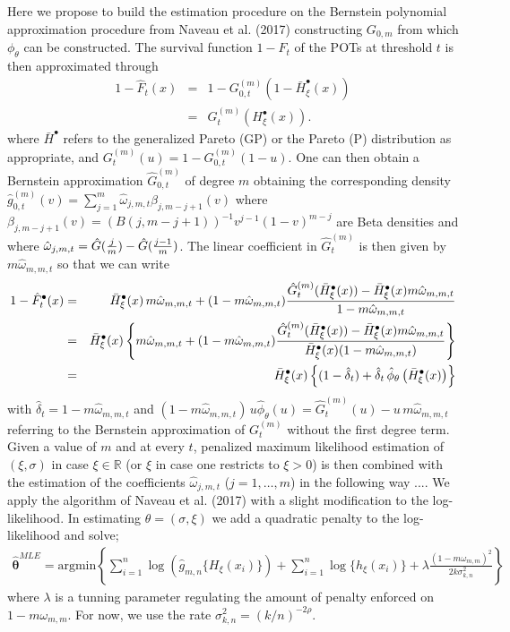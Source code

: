\documentclass[a4paper,11pt]{article}
\begin{document}
 Here we propose to build the estimation procedure on the Bernstein polynomial approximation procedure from Naveau et al. (2017) constructing $G_{0,m}$ from which $\phi_{\theta}$ can be constructed. The survival function $1-F_t$ of the POTs at threshold $t$ is then approximated through
 \begin{eqnarray*}
 1-\hat{F}_t(x) &=& 1- G_{0,t}^{(m)}\left(1-\bar{H}^{\bullet}_{\xi}(x)\right) \\
 &=& G_{t}^{(m)}\left( H^{\bullet}_{\xi}(x) \right). 
  \end{eqnarray*} 
 where $\bar{H}^{\bullet}$ refers to the generalized Pareto (GP) or the Pareto (P) distribution as appropriate, and $G_{t}^{(m)}(u)=1-G_{0,t}^{(m)}(1-u)$. 
 One can then obtain a Bernstein approximation $\hat{G}_{0,t}^{(m)}$ of degree $m$ obtaining the corresponding density 
 $\hat{g}_{0,t}^{(m)}(v) = \sum_{j=1}^m  \hat{\omega}_{j,m,t}\beta_{j,m-j+1}(v)$ where $\beta_{j,m-j+1}(v)= (B(j,m-j+1))^{-1}v^{j-1}(1-v)^{m-j} $ are Beta densities and where
 $\hat{\omega}_{j,m,t}= \hat{G}({j \over m})-\hat{G}({j-1 \over m})$. The linear coefficient in $\hat{G}_t^{(m)}$ is then given by $m\hat{\omega}_{m,m,t}$ so that we can write
 \begin{eqnarray}
 1-\hat{F}^{\bullet}_t(x) &=& 
\bar{H}_{\xi}^{\bullet}(x)\, m\hat{\omega}_{m,m,t} + (1-m\hat{\omega}_{m,m,t}){ \hat{G}^{(m)}_t(\bar{H}^{\bullet}_{\xi}(x))-\bar{H}^{\bullet}_{\xi}(x)m\hat{\omega}_{m,m,t} \over 1-m\hat{\omega}_{m,m,t}}\\
&=& \bar{H}^{\bullet}_{\xi}(x) \left\{
m\hat{\omega}_{m,m,t} + (1-m\hat{\omega}_{m,m,t}){ \hat{G}^{(m)}_t(\bar{H}^{\bullet}_{\xi}(x))-\bar{H}^{\bullet}_{\xi}(x)m\hat{\omega}_{m,m,t} \over \bar{H}^{\bullet}_{\xi}(x) (1-m\hat{\omega}_{m,m,t})}
\right\} \\
&=& \bar{H}^{\bullet}_{\xi}(x) \left\{ (1-\hat{\delta}_t) 
+ \hat{\delta}_t \, \hat{\phi}_{\theta} \left( \bar{H}^{\bullet}_{\xi}(x)\right)\right\} 
 \end{eqnarray}
 with $\hat{\delta}_t = 1-m\hat{\omega}_{m,m,t}$ and $(1-m\hat{\omega}_{m,m,t}) \, u \hat{\phi}_{\theta}(u) =  \hat{G}^{(m)}_t(u)-u \, m\hat{\omega}_{m,m,t} $ referring to the Bernstein approximation of $G_t^{(m)}$ without the first degree term. \\
 
 Given a value of $m$ and at every $t$, penalized maximum likelihood estimation of $(\xi,\sigma)$ in case $\xi \in \mathbb{R}$ (or $\xi$ in case one restricts to $\xi >0$) is then combined with the estimation of the coefficients $\hat{\omega}_{j,m,t}$ ($j=1,\ldots,m$) in the following way ....
 \newpage
We apply the algorithm of Naveau et al. (2017) with a slight modification to the log-likelihood. In estimating $\theta = (\sigma, \xi)$ we add a quadratic penalty to the log-likelihood and solve;
\begin{eqnarray}
\boldsymbol{\hat{\theta}}^{MLE} = \text{argmin}\left\{\sum_{i=1}^{n}\log (\hat{g}_{m,n}\{H_{\xi}(x_i)\})+\sum_{i=1}^{n}\log \{h_{\xi}(x_i)\} + \lambda \frac{(1-m\omega_{m,m})^2}{2k\sigma_{k,n}^2}\right\}
\end{eqnarray}where $\lambda$ is a tunning parameter regulating the amount of penalty enforced on $1-m\omega_{m,m}$. For now, we use the rate $\sigma_{k,n}^2=(k/n)^{-2\rho}$.
\end{document}
